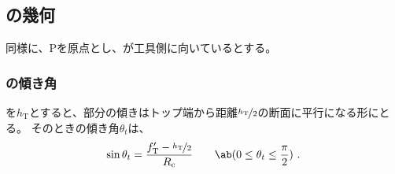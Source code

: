 \clearpage
\subsection{\TopCurvedOutcut の幾何}
同様に、\TableCenter Pを原点とし、\TopEndFace が工具側に向いているとする。

\subsubsection{\TopCurvedOutcut の傾き角}
\TopOutcutLength を$h_\mathrm T$とすると、\nameCurvedOutcut 部分の傾きはトップ端から距離$\nicefrac{h_\mathrm T}2$の断面に平行になる形にとる。
そのときの傾き角$\theta_t$は、
\begin{align}
  \label{eq:TCurvedOutcutAngle}
  \sin\theta_t = \frac{f_\mathrm T'-\nicefrac{h_\mathrm T}2}{R_\mathrm c}
  \qquad\ab(0 \leq \theta_t \leq \frac\pi2)\ .
\end{align}

